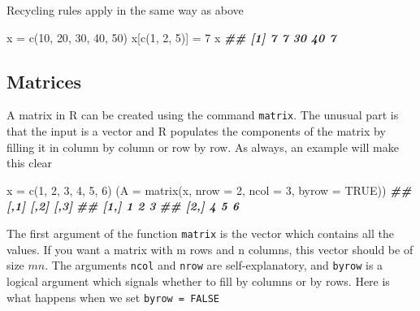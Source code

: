 \documentclass[
]{book}
\newenvironment{Shaded}{\begin{snugshade}}{\end{snugshade}}
\newcommand{\AttributeTok}[1]{\textcolor[rgb]{0.77,0.63,0.00}{#1}}
\newcommand{\ConstantTok}[1]{\textcolor[rgb]{0.00,0.00,0.00}{#1}}
\newcommand{\DecValTok}[1]{\textcolor[rgb]{0.00,0.00,0.81}{#1}}
\newcommand{\DocumentationTok}[1]{\textcolor[rgb]{0.56,0.35,0.01}{\textbf{\textit{#1}}}}
\newcommand{\FunctionTok}[1]{\textcolor[rgb]{0.00,0.00,0.00}{#1}}
\newcommand{\NormalTok}[1]{#1}
\newcommand{\OtherTok}[1]{\textcolor[rgb]{0.56,0.35,0.01}{#1}}
\theoremstyle{definition}
\theoremstyle{definition}
\theoremstyle{definition}
\theoremstyle{definition}
\theoremstyle{remark}
\begin{document}
Recycling rules apply in the same way as above

\begin{Shaded}
\begin{Highlighting}[]
\NormalTok{x }\OtherTok{=} \FunctionTok{c}\NormalTok{(}\DecValTok{10}\NormalTok{, }\DecValTok{20}\NormalTok{, }\DecValTok{30}\NormalTok{, }\DecValTok{40}\NormalTok{, }\DecValTok{50}\NormalTok{)}
\NormalTok{x[}\FunctionTok{c}\NormalTok{(}\DecValTok{1}\NormalTok{, }\DecValTok{2}\NormalTok{, }\DecValTok{5}\NormalTok{)] }\OtherTok{=} \DecValTok{7}
\NormalTok{x}
\DocumentationTok{\#\# [1]  7  7 30 40  7}
\end{Highlighting}
\end{Shaded}

\hypertarget{matrices}{%
\subsection{Matrices}\label{matrices}}

A matrix in R can be created using the command \texttt{matrix}. The unusual part is that the input is a vector and R populates the components of the matrix by filling it in column by column or row by row. As always, an example will make this clear

\begin{Shaded}
\begin{Highlighting}[]
\NormalTok{x }\OtherTok{=} \FunctionTok{c}\NormalTok{(}\DecValTok{1}\NormalTok{, }\DecValTok{2}\NormalTok{, }\DecValTok{3}\NormalTok{, }\DecValTok{4}\NormalTok{, }\DecValTok{5}\NormalTok{, }\DecValTok{6}\NormalTok{)}
\NormalTok{(}\AttributeTok{A =} \FunctionTok{matrix}\NormalTok{(x, }\AttributeTok{nrow =} \DecValTok{2}\NormalTok{, }\AttributeTok{ncol =} \DecValTok{3}\NormalTok{, }\AttributeTok{byrow =} \ConstantTok{TRUE}\NormalTok{))}
\DocumentationTok{\#\#      [,1] [,2] [,3]}
\DocumentationTok{\#\# [1,]    1    2    3}
\DocumentationTok{\#\# [2,]    4    5    6}
\end{Highlighting}
\end{Shaded}

The first argument of the function \texttt{matrix} is the vector which contains all the values. If you want a matrix with m rows and n columns, this vector should be of size \(m n\). The arguments \texttt{ncol} and \texttt{nrow} are self-explanatory, and \texttt{byrow} is a logical argument which signals whether to fill by columns or by rows. Here is what happens when we set \texttt{byrow\ =\ FALSE}
\end{document}
